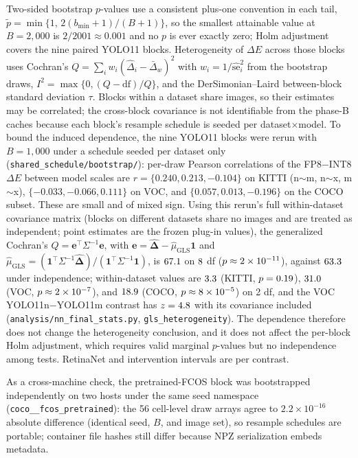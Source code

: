 \documentclass[10pt]{article}
\begin{document}
Two-sided bootstrap $p$-values use a consistent plus-one convention in each
tail, $\widetilde p=\min\{1,\,2(b_{\min}+1)/(B+1)\}$, so the smallest
attainable value at $B=2{,}000$ is $2/2001\approx0.001$ and no $p$ is ever
exactly zero; Holm adjustment covers the nine paired YOLO11 blocks. Heterogeneity of
$\Delta E$ across those blocks uses Cochran's
$Q=\sum_i w_i(\hat\Delta_i-\bar\Delta_w)^2$ with $w_i=1/\widehat{\mathrm{se}}_i^2$
from the bootstrap draws, $I^2=\max\{0,(Q-\mathrm{df})/Q\}$, and the
DerSimonian--Laird between-block standard deviation $\tau$. Blocks within a
dataset share images, so their estimates may be correlated; the cross-block
covariance is not identifiable from the phase-B caches because each block's
resample schedule is seeded per dataset$\times$model. To bound the induced
dependence, the nine YOLO11 blocks were rerun with $B=1{,}000$ under a
schedule seeded per dataset only (\texttt{shared\_schedule/bootstrap/}):
per-draw Pearson correlations of the FP8$-$INT8 $\Delta E$ between model
scales are $r=\{0.240, 0.213, -0.104\}$ on KITTI (n$\sim$m, n$\sim$x,
m$\sim$x), $\{-0.033, -0.066, 0.111\}$ on VOC, and $\{0.057, 0.013, -0.196\}$
on the COCO subset. These are small and of mixed sign. Using this rerun's full within-dataset covariance
matrix (blocks on different datasets share no images and are treated as
independent; point estimates are the frozen plug-in values), the generalized
Cochran's $Q=\mathbf e^\top\Sigma^{-1}\mathbf e$, with $\mathbf e=\hat{\boldsymbol\Delta}-\hat\mu_{\mathrm{GLS}}\mathbf 1$ and
$\hat\mu_{\mathrm{GLS}}=(\mathbf 1^\top\Sigma^{-1}\hat{\boldsymbol\Delta})/(\mathbf 1^\top\Sigma^{-1}\mathbf 1)$, is
$67.1$ on $8$ df ($p\approx2\times10^{-11}$), against $63.3$
under independence; within-dataset values are $3.3$ (KITTI,
$p=0.19$), $31.0$ (VOC, $p\approx2\times10^{-7}$), and
$18.9$ (COCO, $p\approx8\times10^{-5}$) on 2 df, and the VOC
YOLO11n$-$YOLO11m contrast has $z=4.8$ with its covariance included
(\texttt{analysis/nn\_final\_stats.py}, \texttt{gls\_heterogeneity}). The
dependence therefore does not change the heterogeneity conclusion, and it does
not affect the per-block Holm adjustment, which requires valid marginal
$p$-values but no independence among tests. RetinaNet and
intervention intervals are per contrast.

As a cross-machine check, the pretrained-FCOS block was bootstrapped
independently on two hosts under the same seed namespace
(\texttt{coco\_\_fcos\_pretrained}): the 56 cell-level draw arrays agree to
$2.2\times10^{-16}$ absolute difference (identical seed, $B$, and image
set), so resample schedules are portable; container file hashes still
differ because NPZ serialization embeds metadata.
\end{document}
